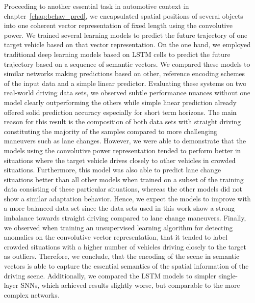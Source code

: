 Proceeding to another essential task in automotive context in chapter~\ref{chap:behav_pred}, we encapsulated spatial positions of several objects into one coherent vector representation of fixed length using the convolutive power.
We trained several learning models to predict the future trajectory of one target vehicle based on that vector representation.
On the one hand, we employed traditional deep learning models based on \ac{LSTM} cells to predict the future trajectory based on a sequence of semantic vectors.
We compared these models to similar networks making predictions based on other, reference encoding schemes of the input data and a simple linear predictor.
Evaluating these systems on two real-world driving data sets, we observed subtle performance nuances without one model clearly outperforming the others while simple linear prediction already offered solid prediction accuracy especially for short term horizons.
The main reason for this result is the composition of both data sets with straight driving constituting the majority of the samples compared to more challenging maneuvers such as lane changes.
However, we were able to demonstrate that the models using the convolutive power representation tended to perform better in situations where the target vehicle drives closely to other vehicles in crowded situations.
Furthermore, this model was also able to predict lane change situations better than all other models when trained on a subset of the training data consisting of these particular situations, whereas the other models did not show a similar adaptation behavior.
Hence, we expect the models to improve with a more balanced data set since the data sets used in this work show a strong imbalance towards straight driving compared to lane change maneuvers.
Finally, we observed when training an unsupervised learning algorithm for detecting anomalies on the convolutive vector representation, that it tended to label crowded situations with a higher number of vehicles driving closely to the target as outliers.
Therefore, we conclude, that the encoding of the scene in semantic vectors is able to capture the essential semantics of the spatial information of the driving scene.
Additionally, we compared the \ac{LSTM} models to simpler single-layer \acp{SNN}, which achieved results slightly worse, but comparable to the more complex networks.

